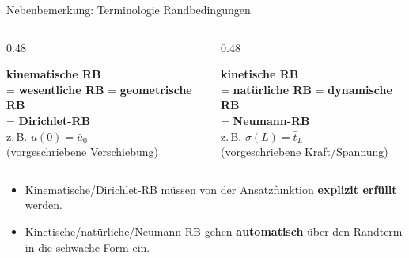 \documentclass[aspectratio=169,professionalfonts]{beamer}
\begin{document}
\begin{frame}{Nebenbemerkung: Terminologie Randbedingungen}
  \begin{columns}[T,onlytextwidth]
    \begin{column}{0.48\textwidth}
      \centering
      \begin{tcolorbox}[colback=orange!10, colframe=blue!70!black,
          boxrule=1.5pt, left=6pt, right=6pt, top=5pt, bottom=5pt,
          title={\textbf{Verschiebungs-RB}}, fonttitle=\small\bfseries]
        \small\centering
        \textbf{kinematische RB}\\[0.3em]
        = \textbf{wesentliche RB} = \textbf{geometrische RB}\\[0.3em]
        = \textbf{Dirichlet-RB}\\[0.6em]
        z.\,B.\; $u(0) = \bar{u}_0$\\[0.3em]
        \footnotesize(vorgeschriebene Verschiebung)
      \end{tcolorbox}
    \end{column}
    \begin{column}{0.48\textwidth}
      \centering
      \begin{tcolorbox}[colback=orange!10, colframe=orange!80!black,
          boxrule=1.5pt, left=6pt, right=6pt, top=5pt, bottom=5pt,
          title={\textbf{Spannungs-RB}}, fonttitle=\small\bfseries]
        \small\centering
        \textbf{kinetische RB}\\[0.3em]
        = \textbf{natürliche RB} = \textbf{dynamische RB}\\[0.3em]
        = \textbf{Neumann-RB}\\[0.6em]
        z.\,B.\; $\sigma(L) = \bar{t}_L$\\[0.3em]
        \footnotesize(vorgeschriebene Kraft/Spannung)
      \end{tcolorbox}
    \end{column}
  \end{columns}

  \vspace{1.0em}
  \small
  \begin{itemize}
    \item Kinematische/Dirichlet-RB müssen von der Ansatzfunktion \textbf{explizit erfüllt} werden.
    \item Kinetische/natürliche/Neumann-RB gehen \textbf{automatisch} über den Randterm in die schwache Form ein.
  \end{itemize}
\end{frame}
\end{document}
